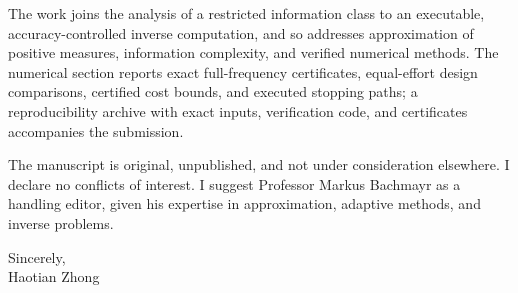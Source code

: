 \documentclass[11pt,letterpaper]{article}
\begin{document}
The work joins the analysis of a restricted information class to an executable, accuracy-controlled inverse computation, and so addresses approximation of positive measures, information complexity, and verified numerical methods. The numerical section reports exact full-frequency certificates, equal-effort design comparisons, certified cost bounds, and executed stopping paths; a reproducibility archive with exact inputs, verification code, and certificates accompanies the submission.

The manuscript is original, unpublished, and not under consideration elsewhere. I declare no conflicts of interest. I suggest Professor Markus Bachmayr as a handling editor, given his expertise in approximation, adaptive methods, and inverse problems.

Sincerely,\\[0.35em]
Haotian Zhong
\end{document}
